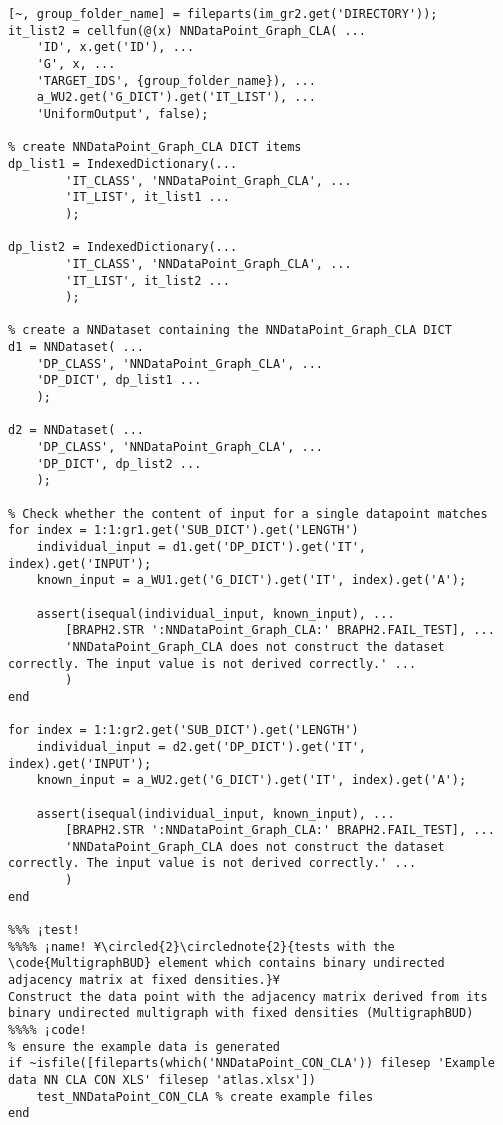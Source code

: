 \documentclass{tufte-handout}
\begin{document}
\begin{lstlisting}
[~, group_folder_name] = fileparts(im_gr2.get('DIRECTORY'));
it_list2 = cellfun(@(x) NNDataPoint_Graph_CLA( ...
    'ID', x.get('ID'), ...
    'G', x, ...
    'TARGET_IDS', {group_folder_name}), ...
    a_WU2.get('G_DICT').get('IT_LIST'), ...
    'UniformOutput', false);

% create NNDataPoint_Graph_CLA DICT items
dp_list1 = IndexedDictionary(...
        'IT_CLASS', 'NNDataPoint_Graph_CLA', ...
        'IT_LIST', it_list1 ...
        );

dp_list2 = IndexedDictionary(...
        'IT_CLASS', 'NNDataPoint_Graph_CLA', ...
        'IT_LIST', it_list2 ...
        );

% create a NNDataset containing the NNDataPoint_Graph_CLA DICT
d1 = NNDataset( ...
    'DP_CLASS', 'NNDataPoint_Graph_CLA', ...
    'DP_DICT', dp_list1 ...
    );

d2 = NNDataset( ...
    'DP_CLASS', 'NNDataPoint_Graph_CLA', ...
    'DP_DICT', dp_list2 ...
    );

% Check whether the content of input for a single datapoint matches
for index = 1:1:gr1.get('SUB_DICT').get('LENGTH')
    individual_input = d1.get('DP_DICT').get('IT', index).get('INPUT');
    known_input = a_WU1.get('G_DICT').get('IT', index).get('A');

    assert(isequal(individual_input, known_input), ...
        [BRAPH2.STR ':NNDataPoint_Graph_CLA:' BRAPH2.FAIL_TEST], ...
        'NNDataPoint_Graph_CLA does not construct the dataset correctly. The input value is not derived correctly.' ...
        )
end

for index = 1:1:gr2.get('SUB_DICT').get('LENGTH')
    individual_input = d2.get('DP_DICT').get('IT', index).get('INPUT');
    known_input = a_WU2.get('G_DICT').get('IT', index).get('A');

    assert(isequal(individual_input, known_input), ...
        [BRAPH2.STR ':NNDataPoint_Graph_CLA:' BRAPH2.FAIL_TEST], ...
        'NNDataPoint_Graph_CLA does not construct the dataset correctly. The input value is not derived correctly.' ...
        )
end

%%% ¡test!
%%%% ¡name! ¥\circled{2}\circlednote{2}{tests with the \code{MultigraphBUD} element which contains binary undirected adjacency matrix at fixed densities.}¥
Construct the data point with the adjacency matrix derived from its binary undirected multigraph with fixed densities (MultigraphBUD)
%%%% ¡code!
% ensure the example data is generated
if ~isfile([fileparts(which('NNDataPoint_CON_CLA')) filesep 'Example data NN CLA CON XLS' filesep 'atlas.xlsx'])
    test_NNDataPoint_CON_CLA % create example files
end


\end{lstlisting}
\end{document}

